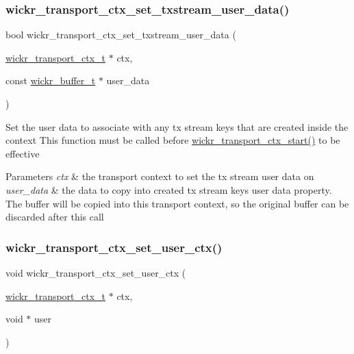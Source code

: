 \subsubsection{\texorpdfstring{wickr\+\_\+transport\+\_\+ctx\+\_\+set\+\_\+txstream\+\_\+user\+\_\+data()}{wickr\_transport\_ctx\_set\_txstream\_user\_data()}}
{\footnotesize\ttfamily bool wickr\+\_\+transport\+\_\+ctx\+\_\+set\+\_\+txstream\+\_\+user\+\_\+data (\begin{DoxyParamCaption}\item[{\hyperlink{structwickr__transport__ctx}{wickr\+\_\+transport\+\_\+ctx\+\_\+t} $\ast$}]{ctx,  }\item[{const \hyperlink{structwickr__buffer}{wickr\+\_\+buffer\+\_\+t} $\ast$}]{user\+\_\+data }\end{DoxyParamCaption})}

Set the user data to associate with any tx stream keys that are created inside the context This function must be called before \hyperlink{group__wickr__transport__ctx_gaee74761e31d5f0a6fc97e2ccf5ac1e29}{wickr\+\_\+transport\+\_\+ctx\+\_\+start()} to be effective


\begin{DoxyParams}{Parameters}
{\em ctx} & the transport context to set the tx stream user data on \\
\hline
{\em user\+\_\+data} & the data to copy into created tx stream keys user data property. The buffer will be copied into this transport context, so the original buffer can be discarded after this call \\
\hline
\end{DoxyParams}
\mbox{\label{group__wickr__transport__ctx_gac1865750950d6ff5ba3850c5f03ab3c9}} 
\subsubsection{\texorpdfstring{wickr\+\_\+transport\+\_\+ctx\+\_\+set\+\_\+user\+\_\+ctx()}{wickr\_transport\_ctx\_set\_user\_ctx()}}
{\footnotesize\ttfamily void wickr\+\_\+transport\+\_\+ctx\+\_\+set\+\_\+user\+\_\+ctx (\begin{DoxyParamCaption}\item[{\hyperlink{structwickr__transport__ctx}{wickr\+\_\+transport\+\_\+ctx\+\_\+t} $\ast$}]{ctx,  }\item[{void $\ast$}]{user }\end{DoxyParamCaption})}

